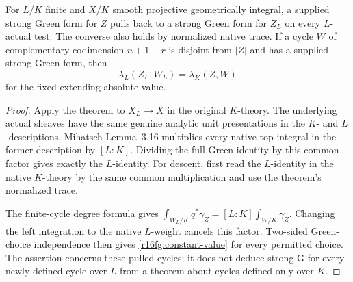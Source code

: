 \begin{corollary}
\label{r16fg:constants}
For $L/K$ finite and $X/K$ smooth projective geometrically
integral, a supplied strong Green form for $Z$ pulls back to
a strong Green form for $Z_L$ on every $L$-actual test.
The converse also holds by normalized native trace. If a cycle
$W$ of complementary codimension $n+1-r$ is disjoint from
$|Z|$ and has a supplied strong Green form, then
\[
                  \lambda_L(Z_L,W_L)=\lambda_K(Z,W)
 \tag{FG16.4}\label{r16fg:constant-value}
\]
for the fixed extending absolute value.
\end{corollary}

\begin{proof}
Apply the theorem to $X_L\to X$ in the original $K$-theory.
The underlying actual sheaves have the same genuine analytic
unit presentations in the $K$- and $L$-descriptions. Mihatsch
Lemma~3.16 multiplies every native top integral in the former
description by $[L:K]$. Dividing the full Green identity by
this common factor gives exactly the $L$-identity. For descent,
first read the $L$-identity in the native $K$-theory by the same
common multiplication and use the theorem's normalized trace.

The finite-cycle degree formula gives
$\int_{W_L/K}q^*\gamma_Z=[L:K]\int_{W/K}\gamma_Z$.
Changing the left integration to the native $L$-weight cancels
this factor. Two-sided Green-choice independence then gives
\eqref{r16fg:constant-value} for every permitted choice.
The assertion concerns these pulled cycles; it does not deduce
strong G for every newly defined cycle over $L$ from a theorem
about cycles defined only over $K$.
\end{proof}
